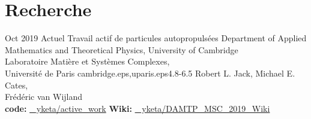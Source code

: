 \documentclass[letterpaper]{cvtemplate_fr} %
\begin{document}
\makeprofile %


\vspace{\parskip}
\section{Recherche}

\begin{cvbody}

\cvitem
	{Oct 2019}
	{Actuel}
  {Travail actif de particules autopropuls\'ees}
  {Department of Applied Mathematics and Theoretical Physics, University of Cambridge \\
	Laboratoire Mati\`ere et Syst\`emes Complexes,\\ Universit\'e de Paris }
	{cambridge.eps,uparis.eps}{4.8}{-6.5}
	{Robert L. Jack, Michael E. Cates,\\ Fr\'ed\'eric van Wijland}
  {\\
  {\bf code:} \href{https://github.com/yketa/active_work}{\faGithub~ yketa/active\_work} \hfill {\bf Wiki:} \href{https://yketa.github.io/DAMTP_MSC_2019_Wiki}{\faGithub~ yketa/DAMTP\_MSC\_2019\_Wiki}
  }
  \\


\end{cvbody}
\end{document}
